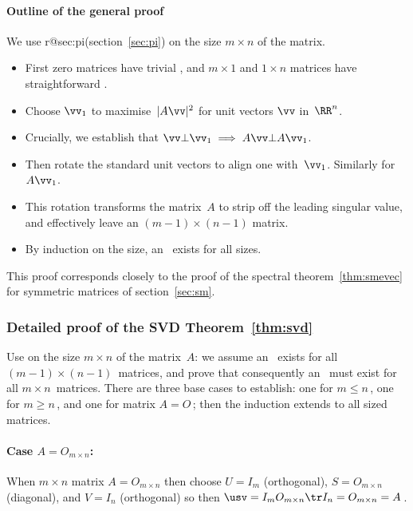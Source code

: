 \paragraph{Outline of the general proof} 
We use  
\ifcsname r@sec:pi\endcsname (section~\ref{sec:pi}) \fi
on the size \(m\times n\) of the matrix.
\begin{itemize}
\item First zero matrices have trivial \svd, and
\(m\times 1\) and \(1\times n\) matrices have straightforward \svd.
\item Choose \(\vv_1\) to maximise~\(|A\vv|^2\) for unit vectors \(\vv\) in~\(\RR^n\).
\item Crucially, we  establish that \(\vv\bot\vv_1\implies A\vv\bot A\vv_1\).
\item Then rotate the standard unit vectors to align one with~\(\vv_1\). Similarly for~\(A\vv_1\).  
\item This rotation transforms the matrix~\(A\) to strip off the leading singular value, and effectively leave an \((m-1)\times(n-1)\) matrix.
\item  By induction on the size, an \svd\ exists for all sizes.
\end{itemize}
This proof corresponds closely to the proof of the spectral theorem~\ref{thm:smevec} for symmetric matrices of section~\ref{sec:sm}. 





\subsubsection{Detailed proof of the SVD Theorem~\ref{thm:svd}}
\label{sec:dpsvdt}

Use  on the size \(m\times n\) of the matrix~\(A\): we assume an \svd\ exists for all \((m-1)\times(n-1)\)~matrices, and prove that consequently an \svd\ must exist for all \(m\times n\)~matrices.  There are three base cases to establish: one for \(m\leq n\)\,, one for \(m\geq n\)\,, and one for matrix \(A=O\)\,; then the induction extends to all sized matrices.

\paragraph{Case $A=O_{m\times n}$:}
When \(m\times n\) matrix \(A=O_{m\times n}\) then choose \(U=I_m\) (orthogonal), \(S=O_{m\times n}\) (diagonal), and \(V=I_n\) (orthogonal) so then \(\usv=I_mO_{m\times n}\tr I_n=O_{m\times n}=A\)\,.  

